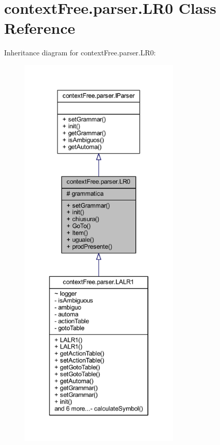 \hypertarget{classcontext_free_1_1parser_1_1_l_r0}{\section{context\-Free.\-parser.\-L\-R0 Class Reference}
\label{classcontext_free_1_1parser_1_1_l_r0}
}


Inheritance diagram for context\-Free.\-parser.\-L\-R0\-:\nopagebreak
\begin{figure}[H]
\begin{center}
\leavevmode
\includegraphics[height=550pt]{classcontext_free_1_1parser_1_1_l_r0__inherit__graph}
\end{center}
\end{figure}


